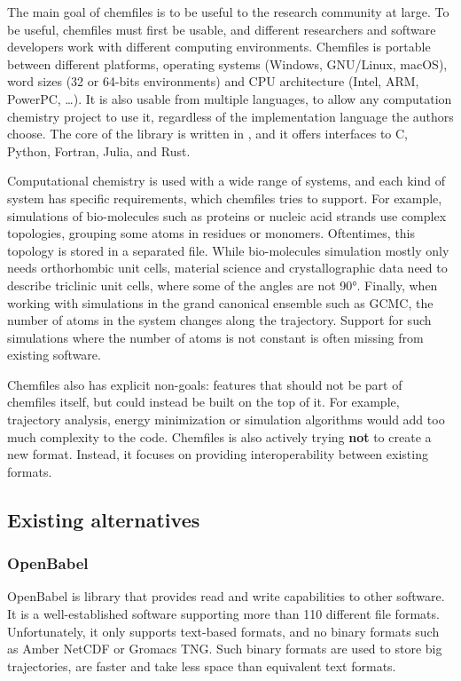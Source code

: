 \documentclass[thesis]{subfiles}
\begin{document}
The main goal of chemfiles is to be useful to the research community at large.
To be useful, chemfiles must first be usable, and different researchers and
software developers work with different computing environments. Chemfiles is
portable between different platforms, operating systems (Windows, GNU/Linux,
macOS), word sizes (32 or 64-bits environments) and CPU architecture (Intel,
ARM, PowerPC, \dots). It is also usable from multiple languages, to allow any
computation chemistry project to use it, regardless of the implementation
language the authors choose. The core of the library is written in \cxx, and it
offers interfaces to C, Python, Fortran, Julia, and Rust.

Computational chemistry is used with a wide range of systems, and each kind of
system has specific requirements, which chemfiles tries to support. For
example, simulations of bio-molecules such as proteins or nucleic acid strands
use complex topologies, grouping some atoms in residues or monomers.
Oftentimes, this topology is stored in a separated file. While bio-molecules
simulation mostly only needs orthorhombic unit cells, material science and
crystallographic data need to describe triclinic unit cells, where some of the
angles are not 90°. Finally, when working with simulations in the grand
canonical ensemble such as GCMC, the number of atoms in the system changes along
the trajectory. Support for such simulations where the number of atoms is not
constant is often missing from existing software.

Chemfiles also has explicit non-goals: features that should not be part of
chemfiles itself, but could instead be built on the top of it. For example,
trajectory analysis, energy minimization or simulation algorithms would add too
much complexity to the code. Chemfiles is also actively trying \textbf{not} to
create a new format. Instead, it focuses on providing interoperability between
existing formats.

\subsection{Existing alternatives}

\subsubsection{OpenBabel}

OpenBabel\cite{OBoyle2011} is \cxx library that provides read and write
capabilities to other software. It is a well-established software supporting
more than 110 different file formats. Unfortunately, it only supports text-based
formats, and no binary formats such as Amber NetCDF or Gromacs TNG. Such binary
formats are used to store big trajectories, are faster and take less space than
equivalent text formats.
\end{document}
